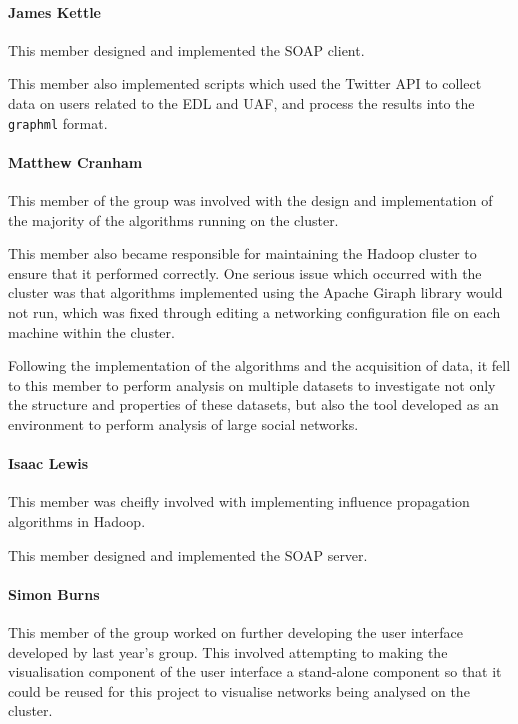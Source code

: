 \paragraph{James Kettle}
This member designed and implemented the SOAP client.

This member also implemented scripts which used the Twitter API to collect data on users related to the EDL and UAF, and process the results into the \verb/graphml/ format.

\paragraph{Matthew Cranham}
This member of the group was involved with the design and implementation of the majority of the algorithms running on the cluster. 

This member also became responsible for maintaining the Hadoop cluster to ensure that it performed correctly. One serious issue which occurred with the cluster was that algorithms implemented using the Apache Giraph library would not run, which was fixed through editing a networking configuration file on each machine within the cluster.

Following the implementation of the algorithms and the acquisition of data, it fell to this member to perform analysis on multiple datasets to investigate not only the structure and properties of these datasets, but also the tool developed as an environment to perform analysis of large social networks.

\paragraph{Isaac Lewis}
This member was cheifly involved with implementing influence propagation algorithms in Hadoop.

This member designed and implemented the SOAP server.

\paragraph{Simon Burns}
This member of the group worked on further developing the user interface developed by last year's group. This involved attempting to making the visualisation component of the user interface a stand-alone component so that it could be reused for this project to visualise networks being analysed on the cluster.
